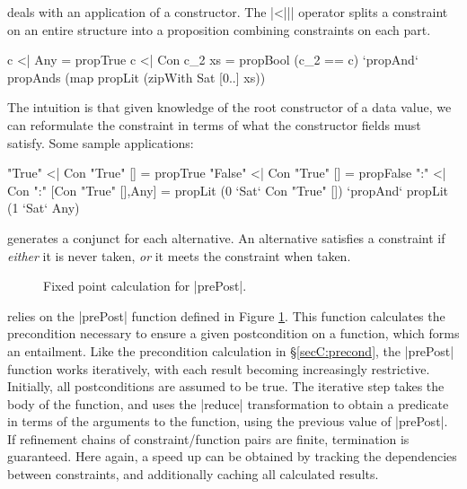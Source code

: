  deals with an application of a constructor. The |<||| operator splits a constraint on an entire structure into a proposition combining constraints on each part.

\begin{code}
c <| Any         =  propTrue
c <| Con c_2 xs  =  propBool (c_2 == c) `propAnd`
                    propAnds (map propLit (zipWith Sat [0..] xs))
\end{code}

The intuition is that given knowledge of the root constructor of a data value, we can reformulate the constraint in terms of what the constructor fields must satisfy. Some sample applications:

\begin{code}
"True"   <| Con "True" [] = propTrue
"False"  <| Con "True" [] = propFalse
":" <| Con ":" [Con "True" [],Any]  =
    propLit (0 `Sat` Con "True" []) `propAnd` propLit (1 `Sat` Any)
\end{code}

 generates a conjunct for each alternative. An alternative satisfies a constraint if \textit{either} it is never taken, \textit{or} it meets the constraint when taken.

\begin{figure}
\ignore{}
\caption{Fixed point calculation for |prePost|.}
\label{figC:property_fixp}
\end{figure}

 relies on the |prePost| function defined in Figure \ref{figC:property_fixp}. This function calculates the precondition necessary to ensure a given postcondition on a function, which forms an entailment. Like the precondition calculation in \S\ref{secC:precond}, the |prePost| function works iteratively, with each result becoming increasingly restrictive. Initially, all postconditions are assumed to be true. The iterative step takes the body of the function, and uses the |reduce| transformation to obtain a predicate in terms of the arguments to the function, using the previous value of |prePost|. If refinement chains of constraint/function pairs are finite, termination is guaranteed. Here again, a speed up can be obtained by tracking the dependencies between constraints, and additionally caching all calculated results.

